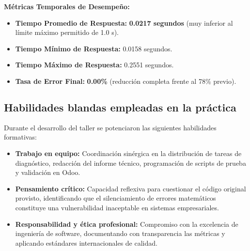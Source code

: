 \documentclass{article}
\begin{document}
\textbf{Métricas Temporales de Desempeño:}
\begin{itemize}
    \item \textbf{Tiempo Promedio de Respuesta:} \textbf{0.0217 segundos} (muy inferior al límite máximo permitido de 1.0 s).
    \item \textbf{Tiempo Mínimo de Respuesta:} 0.0158 segundos.
    \item \textbf{Tiempo Máximo de Respuesta:} 0.2551 segundos.
    \item \textbf{Tasa de Error Final:} \textbf{0.00\%} (reducción completa frente al 78\% previo).
\end{itemize}

\subsection{Habilidades blandas empleadas en la práctica}
Durante el desarrollo del taller se potenciaron las siguientes habilidades formativas:
\begin{itemize}
    \item[$\boxtimes$] \textbf{Trabajo en equipo:} Coordinación sinérgica en la distribución de tareas de diagnóstico, redacción del informe técnico, programación de scripts de prueba y validación en Odoo.
    \item[$\boxtimes$] \textbf{Pensamiento crítico:} Capacidad reflexiva para cuestionar el código original provisto, identificando que el silenciamiento de errores matemáticos constituye una vulnerabilidad inaceptable en sistemas empresariales.
    \item[$\boxtimes$] \textbf{Responsabilidad y ética profesional:} Compromiso con la excelencia de ingeniería de software, documentando con transparencia las métricas y aplicando estándares internacionales de calidad.
\end{itemize}
\end{document}
